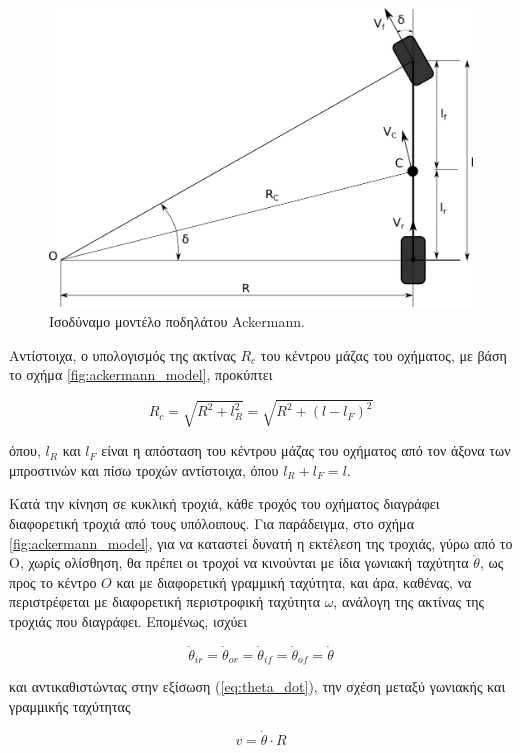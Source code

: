 {\begin{figure}[!ht]
	\centering
	\includegraphics[width=0.6\linewidth]{Chapters/Chapter2/Figures/ackermann_bicycle_model.png}
	\caption{Ισοδύναμο μοντέλο ποδηλάτου Ackermann.}
	\label{fig:ackermann_bicylce_model}
\end{figure}

\bigskip
Αντίστοιχα, ο υπολογισμός της ακτίνας $R_c$ του κέντρου μάζας του οχήματος, με βάση το σχήμα \ref{fig:ackermann_model}, προκύπτει 

\begin{equation}
	R_c = \sqrt{R^2 + l_R^2} = \sqrt{R^2 + (l - l_F)^2}
	\label{eq:ackermann_center_mass_turning_radius}
\end{equation}

\noindent
όπου, $l_R$ και $l_F$ είναι η απόσταση του κέντρου μάζας του οχήματος από τον άξονα των μπροστινών και πίσω τροχών αντίστοιχα, όπου $l_R + l_F = l$.

\bigskip
Κατά την κίνηση σε κυκλική τροχιά, κάθε τροχός του οχήματος διαγράφει διαφορετική τροχιά από τους υπόλοιπους. Για παράδειγμα, στο σχήμα \ref{fig:ackermann_model}, για να καταστεί δυνατή η εκτέλεση της τροχιάς, γύρω από το Ο, χωρίς ολίσθηση, θα πρέπει οι τροχοί να κινούνται με ίδια γωνιακή ταχύτητα $\dot\theta$, ως προς το κέντρο $O$ και με διαφορετική γραμμική ταχύτητα, και άρα, καθένας, να περιστρέφεται με διαφορετική περιστροφική ταχύτητα $\omega$, ανάλογη της ακτίνας της τροχιάς που διαγράφει. Επομένως, ισχύει

\begin{equation}
	\dot\theta_{ir} = \dot\theta_{or} = \dot\theta_{if} = \dot\theta_{of} = \dot\theta
	\label{eq:theta_dot}
\end{equation}

\bigskip
\noindent
και αντικαθιστώντας στην εξίσωση (\ref{eq:theta_dot}), την σχέση μεταξύ γωνιακής και γραμμικής ταχύτητας
	
\begin{equation}
	v = \dot\theta \cdot R
	\label{eq:v_theta}
\end{equation}	

}
